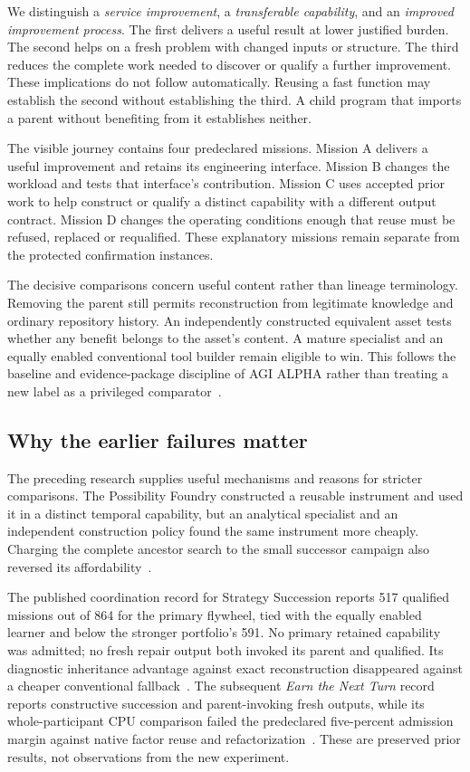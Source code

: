 We distinguish a \emph{service improvement}, a \emph{transferable capability}, and an \emph{improved improvement process}. The first delivers a useful result at lower justified burden. The second helps on a fresh problem with changed inputs or structure. The third reduces the complete work needed to discover or qualify a further improvement. These implications do not follow automatically. Reusing a fast function may establish the second without establishing the third. A child program that imports a parent without benefiting from it establishes neither.

The visible journey contains four predeclared missions. Mission A delivers a useful improvement and retains its engineering interface. Mission B changes the workload and tests that interface's contribution. Mission C uses accepted prior work to help construct or qualify a distinct capability with a different output contract. Mission D changes the operating conditions enough that reuse must be refused, replaced or requalified. These explanatory missions remain separate from the protected confirmation instances.

The decisive comparisons concern useful content rather than lineage terminology. Removing the parent still permits reconstruction from legitimate knowledge and ordinary repository history. An independently constructed equivalent asset tests whether any benefit belongs to the asset's content. A mature specialist and an equally enabled conventional tool builder remain eligible to win. This follows the baseline and evidence-package discipline of AGI ALPHA rather than treating a new label as a privileged comparator~\cite[PDF pp.~37, 60, 69]{agi_alpha}.

\subsection{Why the earlier failures matter}

The preceding research supplies useful mechanisms and reasons for stricter comparisons. The Possibility Foundry constructed a reusable instrument and used it in a distinct temporal capability, but an analytical specialist and an independent construction policy found the same instrument more cheaply. Charging the complete ancestor search to the small successor campaign also reversed its affordability~\cite[PDF pp.~2--4]{possibility_foundry}.

The published coordination record for Strategy Succession reports 517 qualified missions out of 864 for the primary flywheel, tied with the equally enabled learner and below the stronger portfolio's 591. No primary retained capability was admitted; no fresh repair output both invoked its parent and qualified. Its diagnostic inheritance advantage against exact reconstruction disappeared against a cheaper conventional fallback~\cite{strategy_record}. The subsequent \emph{Earn the Next Turn} record reports constructive succession and parent-invoking fresh outputs, while its whole-participant CPU comparison failed the predeclared five-percent admission margin against native factor reuse and refactorization~\cite{earned_turn_record}. These are preserved prior results, not observations from the new experiment.

